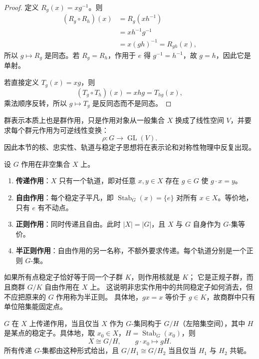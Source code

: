 \begin{proof}
定义 $R_g(x)=xg^{-1}$。则
\begin{align*}
(R_g\circ R_h)(x)
&=R_g(xh^{-1})\\
&=xh^{-1}g^{-1}\\
&=x(gh)^{-1}=R_{gh}(x),
\end{align*}
所以 $g\mapsto R_g$ 是同态。若 $R_g=R_h$，作用于 $e$ 得 $g^{-1}=h^{-1}$，故 $g=h$，因此它是单射。

若直接定义 $T_g(x)=xg$，则
\[
(T_g\circ T_h)(x)=xhg=T_{hg}(x),
\]
乘法顺序反转，所以 $g\mapsto T_g$ 是反同态而不是同态。
\end{proof}

群表示本质上也是群作用，只是作用对象从一般集合 $X$ 换成了线性空间 $V$，并要求每个群元作用为可逆线性变换：
\[
\rho:G\to\operatorname{GL}(V).
\]
因此本节的核、忠实性、轨道与稳定子思想将在表示论和对称性物理中反复出现。

\begin{definition}[群作用的分类]
\label{def:action-types}
设 $G$ 作用在非空集合 $X$ 上。
\begin{enumerate}[label=(\roman*),leftmargin=3em]
\item \textbf{传递作用}：$X$ 只有一个轨道，即对任意 $x,y\in X$ 存在 $g\in G$ 使 $g\cdot x=y$。
\item \textbf{自由作用}：每个稳定子平凡，即 $\operatorname{Stab}_G(x)=\{e\}$ 对所有 $x\in X$。等价地，只有 $e$ 有不动点。
\item \textbf{正则作用}：同时传递且自由。此时 $|X|=|G|$，且 $X$ 与 $G$ 自身作为 $G$-集等价。
\item \textbf{半正则作用}：自由作用的另一名称，不额外要求传递。每个轨道分别是一个正则 $G$-集。
\end{enumerate}
\end{definition}

如果所有点稳定子恰好等于同一个子群 $K$，则作用核就是 $K$；
它是正规子群，而且商群 $G/K$ 自由作用在 $X$ 上。
这说明非忠实作用中的共同稳定子如何消去，但不应把原来的 $G$ 作用称为半正则。
具体地，$gx=x$ 等价于 $g\in K$，故商群中只有单位陪集能固定点。

\begin{proposition}[传递作用的等价刻画]
\label{prop:transitive-action}
$G$ 在 $X$ 上传递作用，当且仅当 $X$ 作为 $G$-集同构于 $G/H$（左陪集空间），其中 $H$ 是某点的稳定子。具体地，取 $x_0\in X$，$H=\operatorname{Stab}_G(x_0)$，则
\[
X\cong G/H,\qquad g\cdot x_0\longmapsto gH.
\]
所有传递 $G$-集都由这种形式给出，且 $G/H_1\cong G/H_2$ 当且仅当 $H_1$ 与 $H_2$ 共轭。

\end{proposition}

